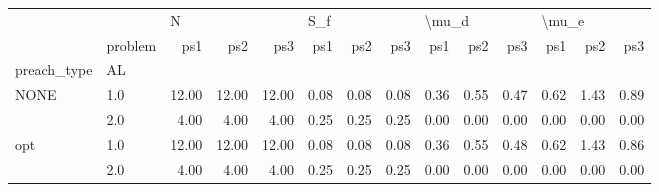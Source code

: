 \begin{tabular}{llrrrrrrrrrrrr}
\toprule
    & {} & \multicolumn{3}{l}{N} & \multicolumn{3}{l}{S\_f} & \multicolumn{3}{l}{\textbackslash mu\_d} & \multicolumn{3}{l}{\textbackslash mu\_e} \\
    & problem &   ps1 &   ps2 &   ps3 &  ps1 &  ps2 &  ps3 &   ps1 &  ps2 &  ps3 &   ps1 &  ps2 &  ps3 \\
preach\_type & AL &       &       &       &      &      &      &       &      &      &       &      &      \\
\midrule
NONE & 1.0 & 12.00 & 12.00 & 12.00 & 0.08 & 0.08 & 0.08 &  0.36 & 0.55 & 0.47 &  0.62 & 1.43 & 0.89 \\
    & 2.0 &  4.00 &  4.00 &  4.00 & 0.25 & 0.25 & 0.25 &  0.00 & 0.00 & 0.00 &  0.00 & 0.00 & 0.00 \\
opt & 1.0 & 12.00 & 12.00 & 12.00 & 0.08 & 0.08 & 0.08 &  0.36 & 0.55 & 0.48 &  0.62 & 1.43 & 0.86 \\
    & 2.0 &  4.00 &  4.00 &  4.00 & 0.25 & 0.25 & 0.25 &  0.00 & 0.00 & 0.00 &  0.00 & 0.00 & 0.00 \\
\bottomrule
\end{tabular}
